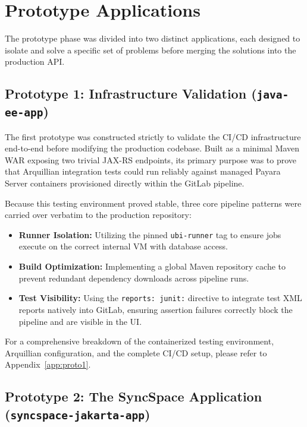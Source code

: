\section{Prototype Applications}
\label{sec:prototypes}

The prototype phase was divided into two distinct applications, each designed
to isolate and solve a specific set of problems before merging the solutions
into the production \ac{API}.

\subsection{Prototype 1: Infrastructure Validation (\texttt{java-ee-app})}
\label{subsec:proto1}

The first prototype was constructed strictly to validate the \ac{CI}/\ac{CD}
infrastructure end-to-end before modifying the production codebase. Built
as a minimal Maven \ac{WAR} exposing two trivial \ac{JAX-RS} endpoints, its primary
purpose was to prove that Arquillian integration tests could run reliably against
managed Payara Server containers provisioned directly within the GitLab pipeline.

Because this testing environment proved stable, three core pipeline
patterns were carried over verbatim to the production repository:
\begin{itemize}
	\item \textbf{Runner Isolation:} Utilizing the pinned \texttt{ubi-runner} tag
		to ensure jobs execute on the correct internal \ac{VM} with database
		access.

	\item \textbf{Build Optimization:} Implementing a global Maven repository
		cache to prevent redundant dependency downloads across pipeline runs.

	\item \textbf{Test Visibility:} Using the \texttt{reports: junit:} directive
		to integrate test \ac{XML} reports natively into GitLab, ensuring assertion
		failures correctly block the pipeline and are visible in the \ac{UI}.
\end{itemize}

For a comprehensive breakdown of the containerized testing environment, Arquillian
configuration, and the complete \ac{CI}/\ac{CD} setup, please refer to Appendix~\ref{app:proto1}.

\subsection{Prototype 2: The SyncSpace Application (\texttt{syncspace-jakarta-app})}
\label{subsec:proto2}

